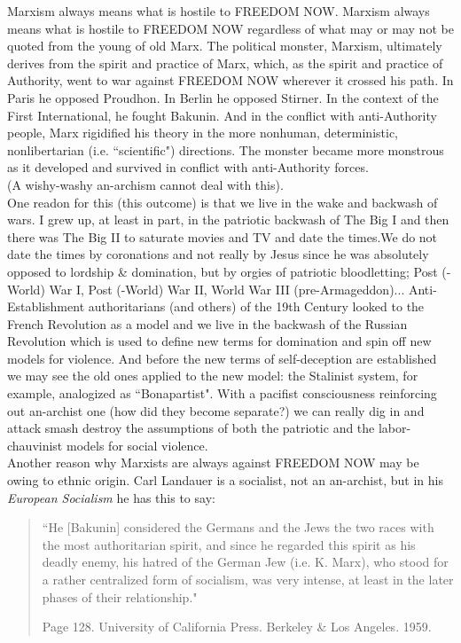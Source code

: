 \documentclass[12pt, onecolumn, letterpaper, oneside]{book}
\begin{document}
Marxism always means what is hostile to FREEDOM NOW. Marxism always means what is hostile to FREEDOM NOW regardless of what may or may not be quoted from the young of old Marx. The political monster, Marxism, ultimately derives from the spirit and practice of Marx, which, as the spirit and practice of Authority, went to war against FREEDOM NOW wherever it crossed his path. In Paris he opposed Proudhon. In Berlin he opposed Stirner. In the context of the First International, he fought Bakunin. And in the conflict with anti-Authority people, Marx rigidified his theory in the more nonhuman, deterministic, nonlibertarian (i.e. ``scientific") directions. The monster became more monstrous as it developed and survived in conflict with anti-Authority forces.\\
(A wishy-washy an-archism cannot deal with this).\\
One readon for this (this outcome) is that we live in the wake and backwash of wars. I grew up, at least in part, in the patriotic backwash of The Big I and then there was The Big II to saturate movies and TV and date the times.We do not date the times by coronations and not really by Jesus since he was absolutely opposed to lordship \& domination, but by orgies of patriotic bloodletting; Post (-World) War I, Post (-World) War II, World War III (pre-Armageddon)... Anti-Establishment authoritarians (and others) of the 19th Century looked to the French Revolution as a model and we live in the backwash of the Russian Revolution which is used to define new terms for domination and spin off new models for violence. And before the new terms of self-deception are established we may see the old ones applied to the new model: the Stalinist system, for example, analogized as ``Bonapartist". With a pacifist consciousness reinforcing out an-archist one (how did they become separate?) we can really dig in and attack smash destroy the assumptions of both the patriotic and the labor-chauvinist models for social violence.\\
Another reason why Marxists are always against FREEDOM NOW may be owing to ethnic origin. Carl Landauer is a socialist, not an an-archist, but in his \emph{European Socialism} he has this to say:
\blockquote{``He [Bakunin] considered the Germans and the Jews the two races with the most authoritarian spirit, and since he regarded this spirit as his deadly enemy, his hatred of the German Jew (i.e. K. Marx), who stood for a rather centralized form of socialism, was very intense, at least in the later phases of their relationship."
\par\begin{flushright} Page 128. University of California Press. Berkeley \& Los Angeles. 1959. \end{flushright}
}
\end{document}

